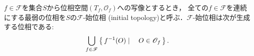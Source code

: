 	\begin{screen}
		\begin{dfn}[始位相]
			$f \in \mathscr{F}$を集合$S$から位相空間$(T_f,\mathscr{O}_f)$への写像とするとき，
			全ての$f \in \mathscr{F}$を連続にする最弱の位相を$S$の$\mathscr{F}$-始位相
			(initial topology)と呼ぶ．$\mathscr{F}$-始位相は次が生成する位相である:
			\begin{align}
				\bigcup_{f \in \mathscr{F}} \left\{\, f^{-1}(O) \mid \quad O \in \mathscr{O}_f\, \right\}.
			\end{align}
		\end{dfn}
	\end{screen}
	
	\begin{screen}
		\begin{dfn}[Cartesian積の位相]
			
		\end{dfn}
	\end{screen}
	
	\begin{screen}
		\begin{dfn}[直積の位相]
			
		\end{dfn}
	\end{screen}